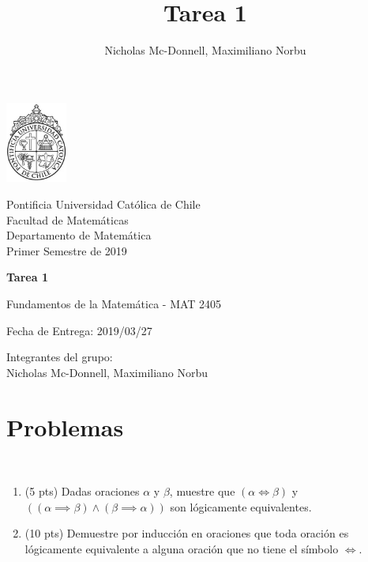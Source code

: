 

\title{Tarea 1}
\author{Nicholas Mc-Donnell, Maximiliano Norbu}


\begin{minipage}{2.5cm}
    \includegraphics[width=2cm]{../figures/logo1.jpg}
\end{minipage}
\begin{minipage}{13cm}
    \begin{flushleft}
        \raggedright
        {
            \noindent
            {\sc Pontificia Universidad Católica de Chile\\
                Facultad de Matemáticas\\
                Departamento de Matemática} \smallskip \\
            Primer Semestre de 2019\\
        }
    \end{flushleft}
\end{minipage}

\vspace{2ex}
{\Large \centerline{\bf Tarea 1}}
{\large \centerline{Fundamentos de la Matemática - MAT 2405}}
\centerline{Fecha de Entrega: 2019/03/27}

\begin{flushright}
    Integrantes del grupo:\\
    Nicholas Mc-Donnell, Maximiliano Norbu
\end{flushright}

\section*{Problemas}

\begin{prob}[15 pts]
    \
    \begin{enumerate}[label=(\alph*)]
        \item (5 pts) Dadas oraciones $\alpha$ y $\beta$, muestre que $(\alpha \iff \beta)$ y $((\alpha \implies \beta) \wedge (\beta \implies \alpha))$ son lógicamente equivalentes.
        \item (10 pts) Demuestre por inducción en oraciones que toda oración es lógicamente equivalente a alguna oración que no tiene el símbolo $\iff$.
    \end{enumerate}
\end{prob}

